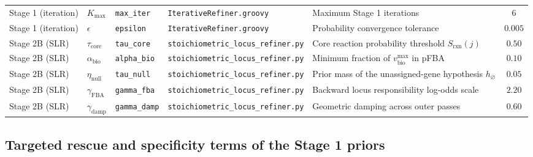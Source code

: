 \documentclass[10pt]{article}
\newcommand{\fn}[1]{\nolinkurl{#1}}
\begin{document}
\begin{table}[h!]
{\begin{tabular}{lllllc}
    Stage 1 (iteration) & $K_{\max}$ & \fn{max_iter} & \fn{IterativeRefiner.groovy} & Maximum Stage 1 iterations & $6$ \\
    Stage 1 (iteration) & $\epsilon$ & \texttt{epsilon} & \fn{IterativeRefiner.groovy} & Probability convergence tolerance & $0.005$ \\
    Stage 2B (SLR) & $\tau_{\text{core}}$ & \fn{tau_core} & \fn{stoichiometric_locus_refiner.py} & Core reaction probability threshold $S_{\text{rxn}}(j)$ & $0.50$ \\
    Stage 2B (SLR) & $\alpha_{\text{bio}}$ & \fn{alpha_bio} & \fn{stoichiometric_locus_refiner.py} & Minimum fraction of $v_{\text{bio}}^{\max}$ in pFBA & $0.10$ \\
    Stage 2B (SLR) & $\eta_{\text{null}}$ & \fn{tau_null} & \fn{stoichiometric_locus_refiner.py} & Prior mass of the unassigned-gene hypothesis $h_\varnothing$ & $0.05$ \\
    Stage 2B (SLR) & $\gamma_{\text{FBA}}$ & \fn{gamma_fba} & \fn{stoichiometric_locus_refiner.py} & Backward locus responsibility log-odds scale & $2.20$ \\
    Stage 2B (SLR) & $\gamma_{\text{damp}}$ & \fn{gamma_damp} & \fn{stoichiometric_locus_refiner.py} & Geometric damping across outer passes & $0.60$ \\
    \bottomrule
  \end{tabular}%
  }
\end{table}

\subsection{Targeted rescue and specificity terms of the Stage 1 priors}
\label{sec:supp_rescue}
\end{document}
